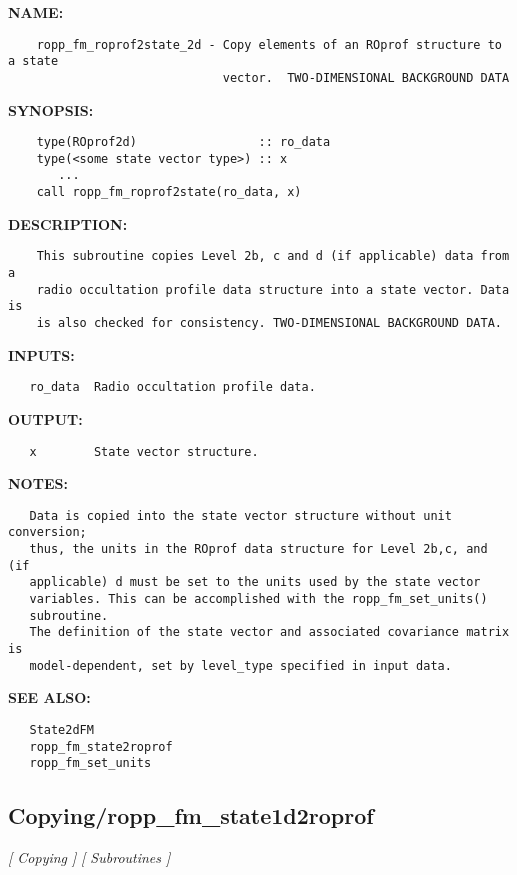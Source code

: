 \label{ch:robo32}
\label{ch:Copying_ropp_fm_roprof2state_2d}
\textbf{NAME:}\hspace{0.08in}\begin{Verbatim}
    ropp_fm_roprof2state_2d - Copy elements of an ROprof structure to a state
                              vector.  TWO-DIMENSIONAL BACKGROUND DATA
\end{Verbatim}
\textbf{SYNOPSIS:}\hspace{0.08in}\begin{Verbatim}
    type(ROprof2d)                 :: ro_data
    type(<some state vector type>) :: x
       ...
    call ropp_fm_roprof2state(ro_data, x)
\end{Verbatim}
\textbf{DESCRIPTION:}\hspace{0.08in}\begin{Verbatim}
    This subroutine copies Level 2b, c and d (if applicable) data from a
    radio occultation profile data structure into a state vector. Data is
    is also checked for consistency. TWO-DIMENSIONAL BACKGROUND DATA.
\end{Verbatim}
\textbf{INPUTS:}\hspace{0.08in}\begin{Verbatim}
   ro_data  Radio occultation profile data.
\end{Verbatim}
\textbf{OUTPUT:}\hspace{0.08in}\begin{Verbatim}
   x        State vector structure.
\end{Verbatim}
\textbf{NOTES:}\hspace{0.08in}\begin{Verbatim}
   Data is copied into the state vector structure without unit conversion;
   thus, the units in the ROprof data structure for Level 2b,c, and (if
   applicable) d must be set to the units used by the state vector 
   variables. This can be accomplished with the ropp_fm_set_units()
   subroutine.
   The definition of the state vector and associated covariance matrix is 
   model-dependent, set by level_type specified in input data.
\end{Verbatim}
\textbf{SEE ALSO:}\hspace{0.08in}\begin{Verbatim}
   State2dFM
   ropp_fm_state2roprof
   ropp_fm_set_units
\end{Verbatim}
\subsection{Copying/ropp\_fm\_state1d2roprof}
\textsl{[ Copying ]}
\textsl{[ Subroutines ]}

